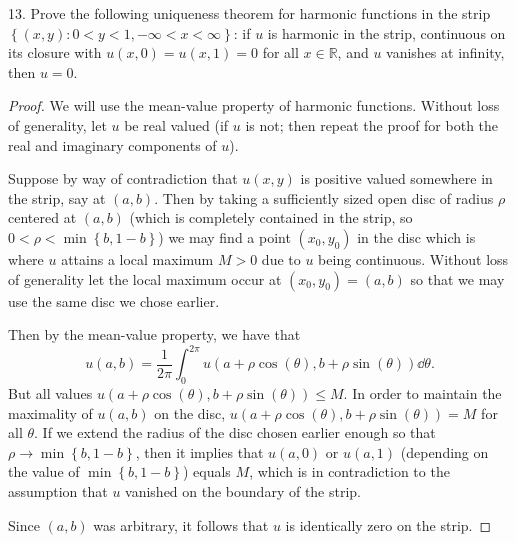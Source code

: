 \documentclass[11pt]{article}
\newcommand{\cbr}[1]{\left\{#1\right\}}
\begin{document}
13. Prove the following uniqueness theorem for harmonic functions in the strip $\cbr{(x,y)\colon 0< y < 1, -\infty < x < \infty}$: if $u$ is harmonic in the strip, continuous on its closure with $u(x,0) = u(x,1) = 0$ for all $x\in \mathbb{R}$, and $u$ vanishes at infinity, then $u = 0$.
\begin{proof}
    We will use the mean-value property of harmonic functions. Without loss of generality, let $u$ be real valued (if $u$ is not; then repeat the proof for both the real and imaginary components of $u$).
    
    Suppose by way of contradiction that $u(x,y)$ is positive valued somewhere in the strip, say at $(a,b)$. Then by taking a sufficiently sized open disc of radius $\rho$ centered at $(a,b)$ (which is completely contained in the strip, so $0< \rho< \min\cbr{b,1-b}$) we may find a point $(x_0,y_0)$ in the disc which is where $u$ attains a local maximum $M>0$ due to $u$ being continuous. Without loss of generality let the local maximum occur at $(x_0,y_0) = (a,b)$ so that we may use the same disc we chose earlier.

    Then by the mean-value property, we have that \[u(a,b) = \frac{1}{2\pi}\int_0^{2\pi}u(a+\rho\cos(\theta), b+\rho\sin(\theta))\dd{\theta}.\] But all values $u(a+\rho\cos(\theta), b+\rho\sin(\theta)) \leq M$. In order to maintain the maximality of $u(a,b)$ on the disc, $u(a+\rho\cos(\theta), b+\rho\sin(\theta)) = M$ for all $\theta$. If we extend the radius of the disc chosen earlier enough so that $\rho\to \min\cbr{b,1-b}$, then it implies that $u(a,0)$ or $u(a,1)$ (depending on the value of $\min\cbr{b,1-b}$) equals $M$, which is in contradiction to the assumption that $u$ vanished on the boundary of the strip.
    
    Since $(a,b)$ was arbitrary, it follows that $u$ is identically zero on the strip.
\end{proof}
\end{document}
